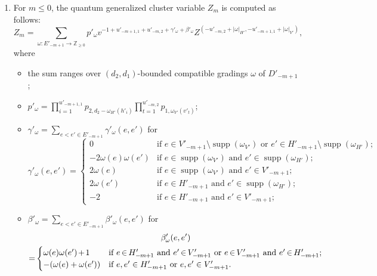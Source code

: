 \documentclass[ALCO,ThmDefs,Unicode,epreuves]{cedram}
\newcommand{\ZZ}{\mathbb{Z}}
\DeclareMathOperator{\supp}{supp}
\newcommand*{\mk}{\mkern -1mu}
\newcommand*{\Mk}{\mkern -2mu}
\begin{document}
\begin{corollary}
\begin{enumerate}
\begin{itemize}
 \end{itemize}
 \item\label{coro5.4_2} For $m\le0$, the quantum generalized cluster variable $Z_m$ is computed as follows:
 \begin{equation}
 \label{eq:combinatorial quantum 2}
 Z_m=\sum\limits_{\omega:E'_{-m+1}\to\ZZ_{\ge0}}p'_\omega v^{-1+u'_{-m+1,1}+u'_{-m,2}+\gamma'_\omega+\beta'_\omega}Z^{(-u'_{-m,2}+|\omega|_{H'},-u'_{-m+1,1}+|\omega|_{V'})},
 \end{equation}
 where 
 \begin{itemize}
 \item the sum ranges over $(d_2,d_1)$-bounded compatible gradings $\omega$ of $D'_{-m+1}$;
 \item $p'_\omega=\prod_{i=1}^{u'_{-m+1,1}}p_{2,d_2-\omega_{H'}(h'_i)}\prod_{t=1}^{u'_{-m,2}}p_{1,\omega_{V'}(v'_t)}$;
 \item $\gamma'_\omega=\sum\limits_{e<e'\in E'_{-m+1}}\gamma'_\omega(e,e')$ for
 \begin{equation*}
 \gamma'_\omega(e,e')=\begin{cases}
 0 & \text{if $e\in V'_{-m+1}\setminus\supp(\omega_{V'})$ or $e'\in H'_{-m+1}\setminus\supp(\omega_{H'})$;}\\ 
 -2\omega(e)\omega(e') & \text{if $e\in\supp(\omega_{V'})$ and $e'\in\supp(\omega_{H'})$;}\\ 
 2\omega(e) & \text{if $e\in\supp(\omega_{V'})$ and $e'\in V'_{-m+1}$;}\\ 
 2\omega(e') & \text{if $e\in H'_{-m+1}$ and $e'\in\supp(\omega_{H'})$;}\\ 
 -2 & \text{if $e\in H'_{-m+1}$ and $e'\in V'_{-m+1}$;}
 \end{cases}
 \end{equation*}
 \item $\beta'_\omega=\sum\limits_{e<e'\in E'_{-m+1}}\beta'_\omega(e,e')$ for
 \begin{multline*}
 \beta'_\omega(e,e')\\
 =\Mk \begin{cases}
 \omega(e)\omega(e')\Mk +\Mk 1 & \text{if $e\Mk \in\Mk H'_{-\mk m\mk +\mk 1}$ and $e'\Mk \in\Mk V'_{-\mk m\mk +\mk 1}$ or $e\Mk \in\Mk V'_{-\mk m\mk +\mk 1}$ and $e'\Mk \in\Mk H'_{-\mk m\mk +\mk 1}$;}\\ 
 -(\omega(e)+\omega(e')) & \text{if $e,e'\in H'_{-m+1}$ or $e,e'\in V'_{-m+1}$.} 
 \end{cases}
 \end{multline*}
 \end{itemize}
 \end{enumerate}
\end{corollary}
\end{document}

